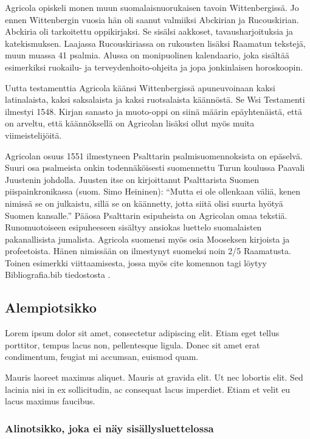 Agricola opiskeli monen muun suomalaisnuorukaisen tavoin Wittenbergissä.
Jo ennen Wittenbergin vuosia hän oli saanut valmiiksi Abckirian ja
Rucouskirian. Abckiria oli tarkoitettu oppikirjaksi. Se sisälsi aakkoset,
tavausharjoituksia ja katekismuksen. Laajassa Rucouskiriassa on rukousten
lisäksi Raamatun tekstejä, muun muassa 41 psalmia. Alussa on monipuolinen
kalendaario, joka sisältää esimerkiksi ruokailu- ja terveydenhoito-ohjeita
ja jopa jonkinlaisen horoskoopin.

Uutta testamenttia Agricola käänsi Wittenbergissä apuneuvoinaan kaksi
latinalaista, kaksi saksalaista ja kaksi ruotsalaista käännöstä. Se
Wsi Testamenti ilmestyi 1548. Kirjan sanasto ja muoto-oppi on siinä
määrin epäyhtenäistä, että on arveltu, että käännöksellä on Agricolan
lisäksi ollut myös muita viimeistelijöitä.

Agricolan osuus 1551 ilmestyneen Psalttarin psalmisuomennoksista on
epäselvä. Suuri osa psalmeista onkin todennäköisesti suomennettu Turun
koulussa Paavali Juustenin johdolla. Juusten itse on kirjoittanut
Psalttarista Suomen piispainkronikassa (suom. Simo Heininen): ``Mutta
ei ole ollenkaan väliä, kenen nimissä se on julkaistu, sillä se on
käännetty, jotta siitä olisi suurta hyötyä Suomen kansalle.'' Pääosa
Psalttarin esipuheista on Agricolan omaa tekstiä. Runomuotoiseen esipuheeseen
sisältyy ansiokas luettelo suomalaisten pakanallisista jumalista.
Agricola suomensi myös osia Mooseksen kirjoista ja profeetoista. Hänen
nimissään on ilmestynyt suomeksi noin 2/5 Raamatusta. Toinen esimerkki
viittaamisesta, jossa myös cite komennon tagi löytyy Bibliografia.bib
tiedostosta \cite{puasuareanu2009survey}.

\subsection{Alempiotsikko}

\label{Alempiotsikko}

Lorem ipsum dolor sit amet, consectetur adipiscing elit. Etiam eget
tellus porttitor, tempus lacus non, pellentesque ligula. Donec sit
amet erat condimentum, feugiat mi accumsan, euismod quam.

Mauris laoreet maximus aliquet. Mauris at gravida elit. Ut nec lobortis
elit. Sed lacinia nisi in ex sollicitudin, ac consequat lacus imperdiet.
Etiam et velit eu lacus maximus faucibus.

\subsubsection{Alinotsikko, joka ei näy sisällysluettelossa}

